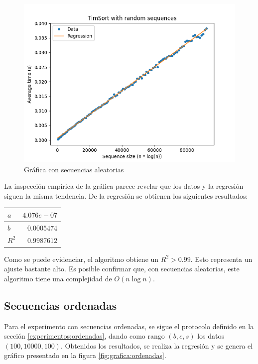 \documentclass[letter]{article}
\begin{document}
\begin{figure}[!htb]
\centering
\includegraphics[scale=0.5]{img/plot_random.png}
\vspace{-1em}
\caption{Gráfica con secuencias aleatorias}
\label{fig:grafica:aleatorias}
\end{figure}

La inspección empírica de la gráfica parece revelar que los datos y la regresión siguen la misma tendencia. De la regresión se obtienen los siguientes resultados: \par

\begin{table}[!ht]
\begin{tabular}{|l|r|}
\hline
$a$   & $4.076e-07$ \\ \hline
$b$   & $0.0005474$ \\ \hline
$R^2$ & $0.9987612$ \\ \hline
\end{tabular}
\end{table}

Como se puede evidenciar, el algoritmo obtiene un $R^2 > 0.99$. Esto representa un ajuste bastante alto. Es posible confirmar que, con secuencias aleatorias, este algoritmo tiene una complejidad de $O(n \log n)$.

\subsection{Secuencias ordenadas} \label{resultados:ordenadas}

Para el experimento con secuencias ordenadas, se sigue el protocolo definido en la sección \ref{experimentos:ordenadas}, dando como rango $(b,e,s)$ los datos $(100,10000,100)$. Obtenidos los resultados, se realiza la regresión y se genera el gráfico presentado en la figura \ref{fig:grafica:ordenadas}.
\end{document}
